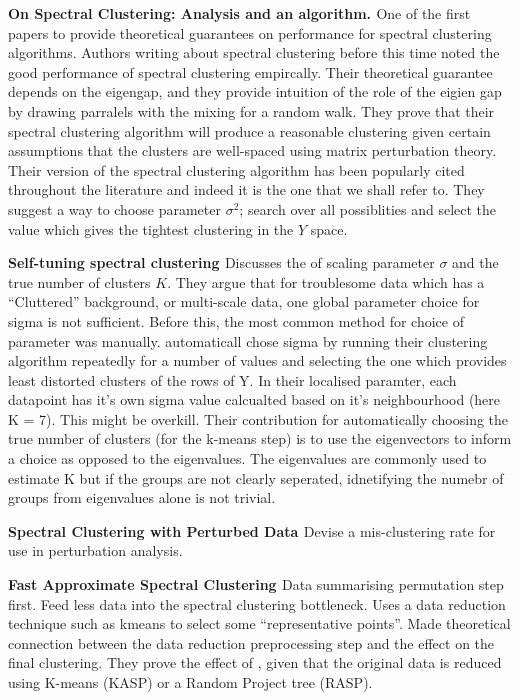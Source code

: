 \documentclass[10pt]{report}
\begin{document}
\textbf{On Spectral Clustering: Analysis and an algorithm. \citep{Ng2001}} One of the first papers to provide theoretical guarantees on performance for spectral clustering algorithms.  Authors writing about spectral clustering before this time noted the good performance of spectral clustering empircally.  Their theoretical guarantee depends on the eigengap, and they provide intuition of the role of the eigien gap by drawing parralels with the mixing for a random walk. They prove that their spectral clustering algorithm will produce a reasonable clustering given certain assumptions that the clusters are well-spaced using matrix perturbation theory. Their version of the spectral clustering algorithm has been popularly cited throughout the literature and indeed it is the one that we shall refer to. They suggest a way to choose parameter $\sigma^2$; search over all possiblities and select the value which gives the tightest clustering in the $Y$ space. 

\textbf{Self-tuning spectral clustering \citep{Zelnik-Manor2004}} Discusses the of scaling parameter $\sigma$ and the true number of clusters $K$. They argue that for troublesome data which has a ``Cluttered'' background, or multi-scale data, one global parameter choice for sigma is not sufficient. Before this, the most common method for choice of parameter was manually. \citep{Ng2001} automaticall chose sigma by running their clustering algorithm repeatedly for a number of values and selecting the one which provides least distorted clusters of the rows of Y. In their localised paramter, each datapoint has it's own sigma value calcualted based on it's neighbourhood (here K = 7). This might be overkill. Their contribution for automatically choosing the true number of clusters (for the k-means step) is to use the eigenvectors to inform a choice as opposed to the eigenvalues. The eigenvalues are commonly used to estimate K but if the groups are not clearly seperated, idnetifying the numebr of groups from eigenvalues alone is not trivial. 

\textbf{Spectral Clustering with Perturbed Data \citep{Huang2009}}
Devise a mis-clustering rate for use in perturbation analysis.

\textbf{Fast Approximate Spectral Clustering \citep{Yan2009}}
Data summarising permutation step first. Feed less data into the spectral clustering bottleneck. Uses a data reduction technique such as kmeans to select some ``representative points''.  Made theoretical connection between the data reduction preprocessing step  and the effect on the final clustering. They prove the effect of , given that the original data is reduced using K-means (KASP) or a Random Project tree (RASP).
\end{document}
